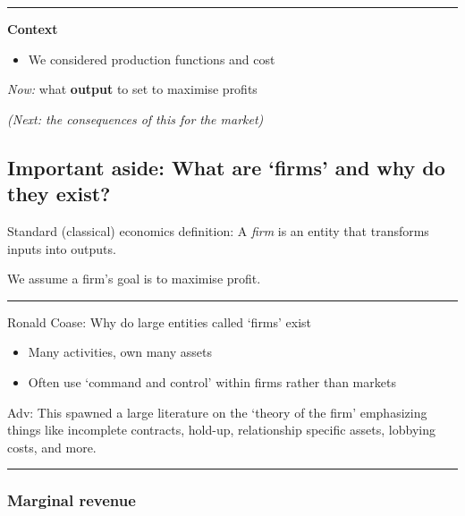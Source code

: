 \documentclass[]{article}
\providecommand{\tightlist}{%
  \setlength{\itemsep}{0pt}\setlength{\parskip}{0pt}}
\begin{document}
\begin{center}\rule{0.5\linewidth}{\linethickness}\end{center}

\textbf{Context}

\begin{itemize}
\tightlist
\item
  We considered production functions and cost
\end{itemize}

\bigskip

\emph{Now:} what \textbf{output} to set to maximise profits

\bigskip

\emph{(Next: the consequences of this for the market)}

\hypertarget{important-aside-what-are-firms-and-why-do-they-exist}{%
\subsection{Important aside: What are `firms' and why do they exist?}\label{important-aside-what-are-firms-and-why-do-they-exist}}

Standard (classical) economics definition: A \emph{firm} is an entity that transforms inputs into outputs.

\bigskip

We assume a firm's goal is to maximise profit.

\begin{center}\rule{0.5\linewidth}{\linethickness}\end{center}

Ronald Coase: Why do large entities called `firms' exist

\bigskip

\begin{itemize}
\tightlist
\item
  Many activities, own many assets
\item
  Often use `command and control' within firms rather than markets
\end{itemize}

Adv: This spawned a large literature on the `theory of the firm' emphasizing things like incomplete contracts, hold-up, relationship specific assets, lobbying costs, and more.

\begin{center}\rule{0.5\linewidth}{\linethickness}\end{center}

\hypertarget{marginal-revenue}{%
\subsubsection{Marginal revenue}\label{marginal-revenue}}
\end{document}
